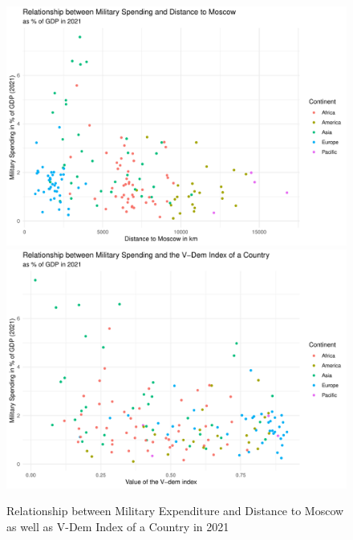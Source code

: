 \documentclass[12pt,a4paper]{article}
\begin{document}
\begin{figure}[h]
\center
\label{F:2}
\includegraphics[scale=0.36]{Plot2.pdf}
\includegraphics[scale=0.36]{Plot3.pdf}
\caption{Relationship between Military Expenditure and Distance to Moscow as well as V-Dem Index of a Country in 2021}
\end{figure}
\end{document}
